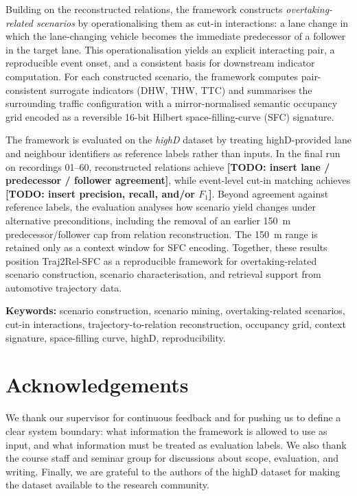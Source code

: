 \documentclass[12pt,a4paper,twoside,openright]{report}
\newcommand{\TODO}[1]{\textbf{[TODO: #1]}}
\newcommand{\FrameworkName}{Traj2Rel-SFC}
\begin{document}
    Building on the reconstructed relations, the framework constructs \emph{overtaking-related scenarios} by operationalising them as cut-in interactions: a lane change in which the lane-changing vehicle becomes the immediate predecessor of a follower in the target lane. This operationalisation yields an explicit interacting pair, a reproducible event onset, and a consistent basis for downstream indicator computation. For each constructed scenario, the framework computes pair-consistent surrogate indicators (DHW, THW, TTC) and summarises the surrounding traffic configuration with a mirror-normalised semantic occupancy grid encoded as a reversible 16-bit Hilbert space-filling-curve (SFC) signature.

    The framework is evaluated on the \textit{highD} dataset by treating highD-provided lane and neighbour identifiers as reference labels rather than inputs. In the final run on recordings 01--60, reconstructed relations achieve \TODO{insert lane / predecessor / follower agreement}, while event-level cut-in matching achieves \TODO{insert precision, recall, and/or $F_1$}. Beyond agreement against reference labels, the evaluation analyses how scenario yield changes under alternative preconditions, including the removal of an earlier \SI{150}{\meter} predecessor/follower cap from relation reconstruction. The \SI{150}{\meter} range is retained only as a context window for SFC encoding. Together, these results position \FrameworkName{} as a reproducible framework for overtaking-related scenario construction, scenario characterisation, and retrieval support from automotive trajectory data.

    \noindent\textbf{Keywords:} scenario construction, scenario mining, overtaking-related scenarios, cut-in interactions, trajectory-to-relation reconstruction, occupancy grid, context signature, space-filling curve, highD, reproducibility.

    \cleardoublepage
    \chapter*{Acknowledgements}

    We thank our supervisor for continuous feedback and for pushing us to define a clear system boundary: what information the framework is allowed to use as input, and what information must be treated as evaluation labels. We also thank the course staff and seminar group for discussions about scope, evaluation, and writing. Finally, we are grateful to the authors of the highD dataset for making the dataset available to the research community.
\end{document}
